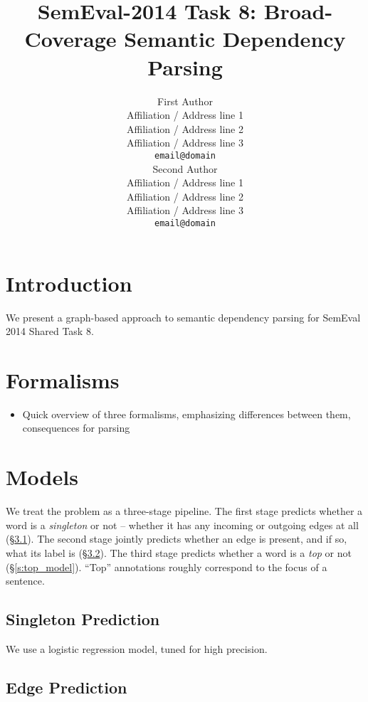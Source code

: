 \documentclass[11pt]{article}
\title{SemEval-2014 Task 8: Broad-Coverage Semantic Dependency Parsing}
\author{First Author \\
  Affiliation / Address line 1 \\
  Affiliation / Address line 2 \\
  Affiliation / Address line 3 \\
  {\tt email@domain} \\\And
  Second Author \\
  Affiliation / Address line 1 \\
  Affiliation / Address line 2 \\
  Affiliation / Address line 3 \\
  {\tt email@domain} \\}
\date{}
\begin{document}
\maketitle
\begin{abstract}
  
\end{abstract}



\section{Introduction}

We present a graph-based approach to semantic dependency parsing for SemEval
2014 Shared Task 8.

\section{Formalisms}

\begin{itemize}
\item Quick overview of three formalisms, emphasizing differences between them, consequences for parsing
\end{itemize}


\section{Models}
\newcommand{\logitedge}{\textsc{LogitEdge}}

We treat the problem as a three-stage pipeline.
The first stage predicts whether a word is a \emph{singleton} or not --
whether it has any incoming or outgoing edges at all
(\S\ref{s:singleton_model}).
The second stage jointly predicts whether an edge is present, and if so, what
its label is (\S\ref{s:edge_model}).
The third stage predicts whether a word is a \emph{top} or not
(\S\ref{s:top_model}).
``Top'' annotations roughly correspond to the focus of a
sentence.


\subsection{Singleton Prediction} \label{s:singleton_model}

We use a logistic regression model, tuned for high precision.


\subsection{Edge Prediction} \label{s:edge_model}
\end{document}
